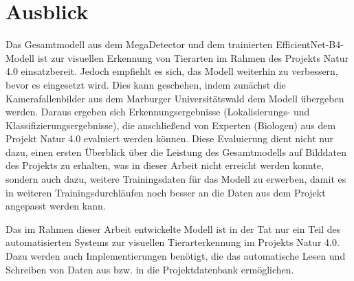 \section{Ausblick} \label{sec:ausblick}

Das Gesamtmodell aus dem MegaDetector und dem trainierten EfficientNet-B4-Modell ist zur visuellen Erkennung von Tierarten im Rahmen des Projekts Natur 4.0 einsatzbereit. Jedoch empfiehlt es sich, das Modell weiterhin zu verbessern, bevor es eingesetzt wird. Dies kann geschehen, indem zunächst die Kamerafallenbilder aus dem Marburger Universitätswald dem Modell übergeben werden. Daraus ergeben sich Erkennungsergebnisse (Lokalisierungs- und Klassifizierungsergebnisse), die anschließend von Experten (Biologen) aus dem Projekt Natur 4.0 evaluiert werden können. Diese Evaluierung dient nicht nur dazu, einen ersten Überblick über die Leistung des Gesamtmodells auf Bilddaten des Projekts zu erhalten, was in dieser Arbeit nicht erreicht werden konnte, sondern auch dazu, weitere Trainingsdaten für das Modell zu erwerben, damit es in weiteren Trainingsdurchläufen noch besser an die Daten aus dem Projekt angepasst werden kann.

Das im Rahmen dieser Arbeit entwickelte Modell ist in der Tat nur ein Teil des automatisierten Systems zur visuellen Tierarterkennung im Projekts Natur 4.0. Dazu werden auch Implementierungen benötigt, die das automatische Lesen und Schreiben von Daten aus bzw. in die Projektdatenbank ermöglichen.

